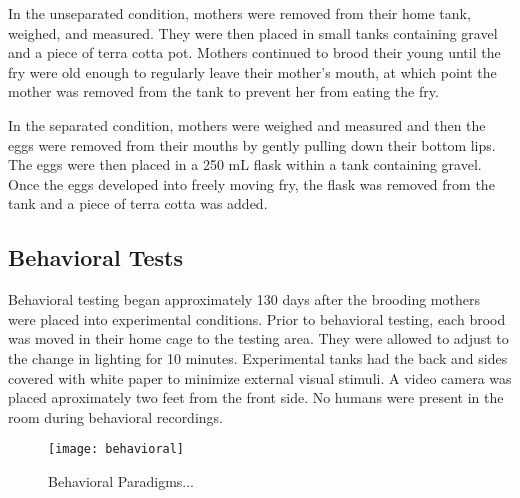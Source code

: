 \documentclass[12pt,twoside]{reedthesis}
\begin{document}
In the unseparated condition, mothers were removed from their home tank, weighed, and measured. They were then placed in small tanks containing gravel and a piece of terra cotta pot. Mothers continued to brood their young until the fry were old enough to regularly leave their mother's mouth, at which point the mother was removed from the tank to prevent her from eating the fry. 

In the separated condition, mothers were weighed and measured and then the eggs
were removed from their mouths by gently pulling down their bottom
lips. The eggs were then placed in a 250 mL flask within a tank containing gravel. Once
the eggs developed into freely moving fry, the flask was removed from the tank and a piece of terra cotta was added.


\subsection{Behavioral Tests}
Behavioral testing began approximately 130 days after the brooding mothers were placed into experimental conditions. Prior to behavioral testing, each brood was moved in their home cage to the
testing area. They were allowed to adjust to the change in lighting for 10
minutes. Experimental tanks had the back and sides covered with white paper to
minimize external visual stimuli. A video camera was placed aproximately two
feet from the front side. No humans were present in the room during behavioral recordings. 

\begin{figure}[htbp] 
\begin{centering} 
\texttt{[image: behavioral]}
\caption[Behavioral Paradigms]{Behavioral Paradigms...} 
\label{subd}
\end{centering} 
\end{figure}
\end{document}
